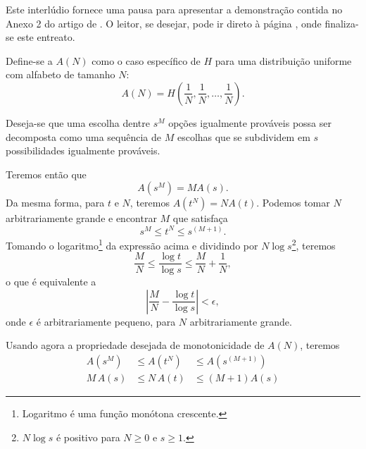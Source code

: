 \begin{interlude}
  \label{beginof:interlude:appendix2}
  Este interlúdio fornece uma pausa para apresentar a demonstração contida no
  Anexo 2 do artigo de \textcite{shannon1948}.  O leitor, se desejar, pode ir
  direto à página \pageref{endof:interlude:appendix2}, onde finaliza-se este
  entreato.

  Define-se a $A(N)$ como o caso específico de $H$ para uma distribuição
  uniforme com alfabeto de tamanho $N$:
  \begin{equation}
  A(N) = H\left( \frac{1}{N}, \frac{1}{N}, \ldots, \frac{1}{N} \right) .
  \end{equation}

  Deseja-se que uma escolha dentre $s^M$ opções igualmente prováveis possa ser
  decomposta como uma sequência de $M$ escolhas que se subdividem em $s$
  possibilidades igualmente prováveis.

  Teremos então que
  \begin{equation}
  A(s^M) = M A(s) .
  \end{equation}
  Da mesma forma, para $t$ e $N$, teremos $A(t^N) = N A(t)$.
  Podemos tomar $N$ arbitrariamente grande e encontrar $M$ que satisfaça
  \begin{equation}
  s^M \leq t^N \leq s^{(M+1)} .
  \end{equation}
  Tomando o logaritmo\footnote{Logaritmo é uma função monótona crescente.} da
  expressão acima e dividindo por $N \log s$\footnote{
      $N \log s$ é positivo para $N \geq 0$ e $s \geq 1$.
  }, teremos
  \begin{equation}
  \frac{M}{N} \leq \frac{\log t}{\log s} \leq \frac{M}{N} + \frac{1}{N} ,
  \end{equation}
  o que é equivalente a
  \begin{equation}
  \left\vert \frac{M}{N} - \frac{\log t}{\log s} \right\vert < \epsilon ,
  \end{equation}
  onde $\epsilon$ é arbitrariamente pequeno, para $N$ arbitrariamente
  grande.

  Usando agora a propriedade desejada de monotonicidade de $A(N)$, teremos
  \begin{subequations}
  \begin{alignat}{3}
  A(s^M) &\leq A(t^N) &\leq A(s^{(M+1)}) \\
  M \, A(s) &\leq N \, A(t) &\leq (M+1)A(s)
  \end{alignat}
  \end{subequations}


\end{interlude}
